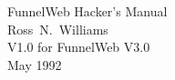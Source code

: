 \def\figfor#1{{\bf Figure~#1}}
\def\tabfor#1{{\bf Table~#1}}

\def\figlicense{\figfor{1}}



\def\gloss#1{\thing{#1:}\x{#1}}


\def\topicbreak{\bigskip\centerline{--- $\S$ ---}\bigskip}




\begin{titlepage}
\vspace*{3cm}
\begin{center}
\Huge
\vspace{2cm}
FunnelWeb Hacker's Manual\\
\vspace{2cm}
\LARGE
Ross~N.~Williams\\
\vspace{1cm}
\Large
V1.0 for FunnelWeb V3.0\\
\vspace{1cm}
May 1992\\
\normalsize
\end{center}
\end{titlepage}


\makeindex



\sloppy
\nonstopmode




